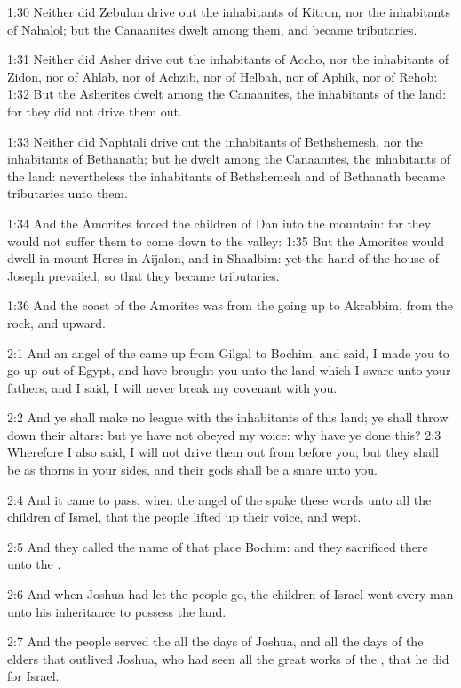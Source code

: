 1:30 Neither did Zebulun drive out the inhabitants of Kitron, nor the
inhabitants of Nahalol; but the Canaanites dwelt among them, and
became tributaries.

1:31 Neither did Asher drive out the inhabitants of Accho, nor the
inhabitants of Zidon, nor of Ahlab, nor of Achzib, nor of Helbah, nor
of Aphik, nor of Rehob: 1:32 But the Asherites dwelt among the
Canaanites, the inhabitants of the land: for they did not drive them
out.

1:33 Neither did Naphtali drive out the inhabitants of Bethshemesh,
nor the inhabitants of Bethanath; but he dwelt among the Canaanites,
the inhabitants of the land: nevertheless the inhabitants of
Bethshemesh and of Bethanath became tributaries unto them.

1:34 And the Amorites forced the children of Dan into the mountain:
for they would not suffer them to come down to the valley: 1:35 But
the Amorites would dwell in mount Heres in Aijalon, and in Shaalbim:
yet the hand of the house of Joseph prevailed, so that they became
tributaries.

1:36 And the coast of the Amorites was from the going up to Akrabbim,
from the rock, and upward.

2:1 And an angel of the \LORD came up from Gilgal to Bochim, and said,
I made you to go up out of Egypt, and have brought you unto the land
which I sware unto your fathers; and I said, I will never break my
covenant with you.

2:2 And ye shall make no league with the inhabitants of this land; ye
shall throw down their altars: but ye have not obeyed my voice: why
have ye done this?  2:3 Wherefore I also said, I will not drive them
out from before you; but they shall be as thorns in your sides, and
their gods shall be a snare unto you.

2:4 And it came to pass, when the angel of the \LORD spake these words
unto all the children of Israel, that the people lifted up their
voice, and wept.

2:5 And they called the name of that place Bochim: and they sacrificed
there unto the \LORD.

2:6 And when Joshua had let the people go, the children of Israel went
every man unto his inheritance to possess the land.

2:7 And the people served the \LORD all the days of Joshua, and all the
days of the elders that outlived Joshua, who had seen all the great
works of the \LORD, that he did for Israel.

